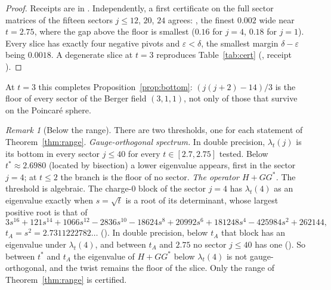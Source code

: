 \documentclass[11pt]{article}
\theoremstyle{definition}
\theoremstyle{remark}
\newtheorem{remark}[theorem]{Remark}
\newif\ifredline
\newcommand{\redins}[1]{\ifredline{\color{blue}#1}\else#1\fi}
\newcommand{\reddel}[1]{\ifredline{\color{red}\sout{#1}}\fi}
\begin{document}
\begin{proof}
Receipts are in . Independently, a first certificate on the full
sector matrices of the fifteen sectors $j\le12$, $20$, $24$ agrees: \reddel{$1{,}091$ slices tile $[2.75,10]$ exactly in each of the fifteen sectors}, the finest $0.002$ wide near
$t=2.75$, where the gap above the floor is smallest ($0.16$ for $j=4$, $0.18$ for $j=1$). Every slice has
exactly four negative pivots and $\varepsilon<\delta$, the smallest margin $\delta-\varepsilon$ being $0.0018$.
A degenerate slice at $t=3$ reproduces Table~\ref{tab:cert}
(, receipt
).
\end{proof}

At $t=3$ this completes Proposition~\ref{prop:bottom}: $(j(j+2)-14)/3$ is the floor of every sector of the
Berger field $(3,1,1)$, not only of those that survive on the Poincar\'e sphere.

\begin{remark}[Below the range]\label{rem:tstar}
There are two thresholds, one for each statement of Theorem~\ref{thm:range}.
\emph{Gauge-orthogonal spectrum.} In double precision, $\lambda_t(j)$ is its bottom in every sector $j\le40$ for
every $t\in[2.7,2.75]$ tested. Below $t^*\approx2.6980$ (located by bisection) a lower eigenvalue appears, first
in the sector $j=4$; at $t\le2$ the branch is the floor of no sector.
\emph{The operator $H+GG^*$.} The threshold is algebraic. The charge-$0$ block of the sector $j=4$ has
$\lambda_t(4)$ as an eigenvalue exactly when $s=\sqrt t$ is a root of its determinant, whose largest positive root
is that of
\[
  3s^{16}+121s^{14}+1066s^{12}-2836s^{10}-18624s^8+20992s^6+181248s^4-425984s^2+262144,
\]
$t_A=s^2=2.7311222782\ldots$ (). In double precision, below $t_A$ that
block has an eigenvalue under $\lambda_t(4)$, and between $t_A$ and $2.75$ no sector $j\le40$ has one
(). So between $t^*$ and $t_A$ the eigenvalue of $H+GG^*$ below
$\lambda_t(4)$ is not gauge-orthogonal, and the twist remains the floor of the slice. Only the range of
Theorem~\ref{thm:range} is certified.
\end{remark}
\end{document}
